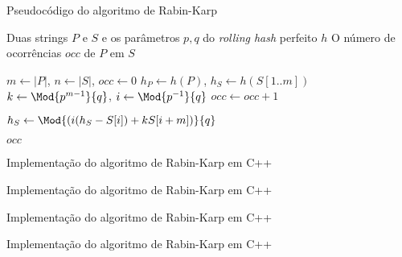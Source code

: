 \begin{frame}[fragile]{Pseudocódigo do algoritmo de Rabin-Karp}

    \begin{algorithm}[H]
        \caption{Algoritmo de Rabin-Karp com \textit{hash} perfeito}
        \begin{algorithmic}[1]
            \Require Duas strings $P$ e $S$ e os parâmetros $p, q$ do \textit{rolling hash} perfeito $h$
            \Ensure O número de ocorrências $occ$ de $P$ em $S$

                \State $m \gets |P|$, $n \gets |S|$, $occ \gets 0$
                \State $h_P \gets h(P)$, $h_S \gets h(S[1..m])$
                \State $k \gets \Mod{p^{m - 1}}{q}$, $i \gets \Mod{p^{-1}}{q}$
                \State
                        \State $occ \gets occ + 1$
                    \EndIf

                        \State $h_S \gets \Mod{\left(i(h_S - S[i]) + kS[i + m]\right)}{q}$
                    \EndIf
                \EndFor

                \State \Return $occ$
            \EndFunction
        \end{algorithmic}
    \end{algorithm}

\end{frame}



\begin{frame}[fragile]{Implementação do algoritmo de Rabin-Karp em C++}
\end{frame}

\begin{frame}[fragile]{Implementação do algoritmo de Rabin-Karp em C++}
\end{frame}

\begin{frame}[fragile]{Implementação do algoritmo de Rabin-Karp em C++}
\end{frame}

\begin{frame}[fragile]{Implementação do algoritmo de Rabin-Karp em C++}
\end{frame}
